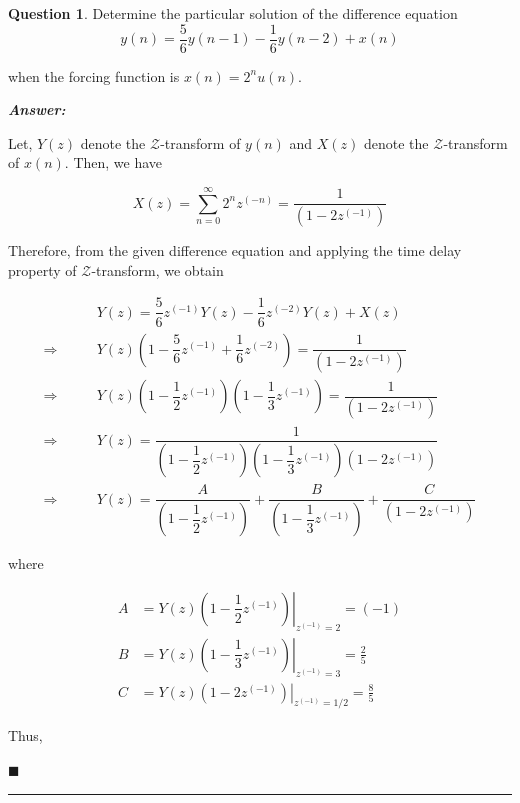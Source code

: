 \documentclass[12pt]{article}
\theoremstyle{definition}
\newtheorem{question}{Question}
\newenvironment{answer}{
    \textbf{\textit{Answer:}} \qquad
}{\hfill $\blacksquare$ \\ 

\begin{center}
    \rule{0.8\linewidth}{1.5px} 
    \vspace*{1cm}   
\end{center}
}
\newcommand{\zcal}{\mathcal{Z}}
\newcommand{\inv}[1][1]{^{(- #1)}}
\begin{document}
\begin{question}
    Determine the particular solution of the difference equation 
    $$
    y(n) = \dfrac{5}{6} y(n-1) - \dfrac{1}{6} y(n-2) + x(n)
    $$

    when the forcing function is $x(n) = 2^n u(n)$.
\end{question}

\begin{answer}
    Let, $Y(z)$ denote the $\zcal$-transform of $y(n)$ and $X(z)$ denote the $\zcal$-transform of $x(n)$. Then, we have

    \begin{equation*}
        X(z) = \sum_{n = 0}^{\infty} 2^n z^{(-n)} = \dfrac{1}{(1 - 2z\inv)}
    \end{equation*}
    
    Therefore, from the given difference equation and applying the time delay property of $\zcal$-transform, we obtain  

    \begin{align*}
        & Y(z) = \dfrac{5}{6} z\inv Y(z) - \dfrac{1}{6} z\inv[2] Y(z) + X(z)\\
        \Rightarrow \qquad & Y(z)\left(1 - \dfrac{5}{6}z\inv + \dfrac{1}{6}z\inv[2] \right) = \dfrac{1}{(1 - 2z\inv)} \\
        \Rightarrow \qquad & Y(z) \left( 1 - \dfrac{1}{2}z\inv\right) \left( 1 - \dfrac{1}{3}z\inv\right) = \dfrac{1}{\left( 1 - 2 z\inv \right)}\\
        \Rightarrow \qquad & Y(z) = \dfrac{1}{\left( 1 - \dfrac{1}{2}z\inv\right) \left( 1 - \dfrac{1}{3}z\inv\right)\left( 1 - 2 z\inv \right)} \\
        \Rightarrow \qquad & Y(z) =  \dfrac{A}{\left( 1 - \dfrac{1}{2}z\inv\right)} + \dfrac{B}{\left( 1 - \dfrac{1}{3}z\inv\right)} + \dfrac{C}{\left( 1 - 2z\inv\right)}
    \end{align*}

    where 

    \begin{align*}
        A & = \left. Y(z)\left( 1 - \dfrac{1}{2}z\inv\right) \right\vert_{z\inv = 2} =  (-1)\\
        B & = \left. Y(z)\left( 1 - \dfrac{1}{3}z\inv\right) \right\vert_{z\inv = 3} =  \frac{2}{5}\\
        C & = \left. Y(z)\left( 1 - 2z\inv\right) \right\vert_{z\inv = 1/2} = \frac{8}{5}
    \end{align*}

    Thus,


\end{answer}
\end{document}
